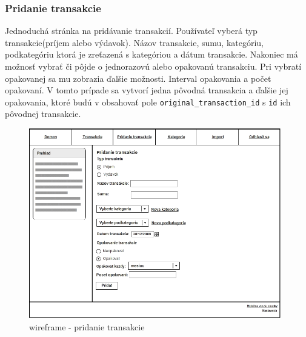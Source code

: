 \documentclass[12pt,oneside]{book}
\begin{document}
\subsubsection{Pridanie transakcie}
Jednoduchá stránka na pridávanie transakcií. Používateľ vyberá typ transakcie(príjem alebo výdavok). Názov transakcie, sumu, kategóriu, podkategóriu ktorá je zreťazená s kategóriou a dátum transakcie. Nakoniec má možnosť vybrať či pôjde o jednorazovú alebo opakovanú transakciu. Pri vybratí opakovanej sa mu zobrazia ďalšie možnosti. Interval opakovania a počet opakovaní. V tomto prípade sa vytvorí jedna pôvodná transakcia a ďalšie jej opakovania, ktoré budú v obsahovať pole \texttt{original\_transaction\_id} s \texttt{id} ich pôvodnej transakcie.
\begin{figure}[ht]
  \centering
      \includegraphics[width=11cm]{wireframe_add}
  \caption{wireframe - pridanie transakcie}
  \label{wireframe - pridanie transakcie}
\end{figure}
 
\end{document}

